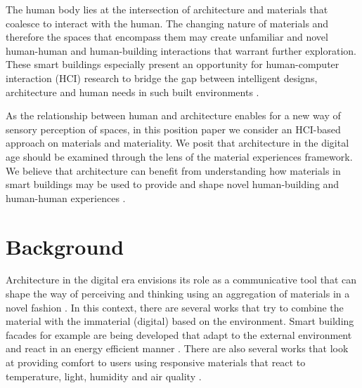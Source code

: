 \documentclass[manuscript, anonymous, review]{acmart}
\begin{document}
The human body lies at the intersection of architecture and materials that coalesce to interact with the human. The changing nature of materials and therefore the spaces that encompass them may create unfamiliar and novel human-human and human-building interactions that warrant further exploration. These smart buildings especially present an opportunity for human-computer interaction (HCI) research to bridge the gap between intelligent designs, architecture and human needs in such built environments \cite{nembrini2017human}.  

As the relationship between human and architecture enables for a new way of sensory perception of spaces, in this position paper we consider an HCI-based approach on materials and materiality. We posit that architecture in the digital age should be examined through the lens of the material experiences framework. We believe that architecture can benefit from understanding how materials in smart buildings may be used to provide and shape novel human-building and human-human experiences  \cite{giaccardi2015foundations, thomas2006material}. 




\section{Background}
Architecture in the digital era envisions its role as a communicative tool that can shape the way of perceiving and thinking using an aggregation of materials in a novel fashion \cite{kolarevic2001designing}. In this context, there are several works that try to combine the material with the immaterial (digital) based on the environment. Smart building facades for example are being developed that adapt to the external environment and react in an energy efficient manner \cite{ahmed2015development}. There are also several works that look at providing comfort to users using responsive materials that react to temperature, light, humidity and air quality \cite{fragkia2020exergy, holstov2015hygromorphic, kroner1997intelligent}. 
\end{document}
